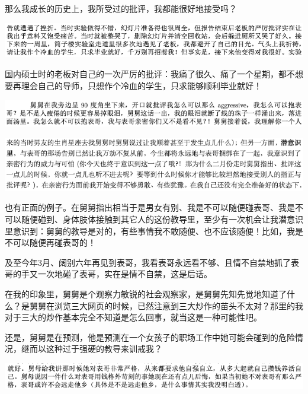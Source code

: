 \documentclass[9pt, b5paper]{article}
\begin{document}
那么我成长的历史上，我所受过的批评，我都能很好地接受吗？

\begin{center}
\includegraphics[width=.9\linewidth]{./pic/backups_plans_20210412_110225.png}
\end{center}

国内硕士时的老板对自己的一次严厉的批评：我痛了很久、痛了一个星期，都不想要再理会自己的导师，只想作个冷血的学生，只求能够顺利毕业就好！

\begin{center}
\includegraphics[width=.9\linewidth]{./pic/backups_plans_20210412_110604.png}
\end{center}

\begin{center}
\includegraphics[width=.9\linewidth]{./pic/backups_plans_20210412_110513.png}
\end{center}

也有正面的例子。在舅舅指出相当于是男女有别、我是不可以随便碰表哥、我是不可以随便碰到、身体肢体接触到其它人的这份教导里，至少有一次机会让我潜意识里意识到：舅舅的教导是对的，有些事情我不敢随便、也不应该随便！比如，我是不可以随便再碰表哥的！

及至今年3月、阔别六年再见到表哥，我看表哥永远看不够、且情不自禁地抓了表哥的手又一次地碰了表哥，实在是情不自禁，这是后话。 

在我的印象里，舅舅是个观察力敏锐的社会观察家，是舅舅先知先觉地知道了什么？是舅舅在浏览三大网页的时候，已然注意到三大炒作的苗头不太对？那里的我对于三大的炒作基本完全不知道是怎么回事，就当这是一种可能性吧。

还是，舅舅是在预测，他是预测在一个女孩子的职场工作中她可能会碰到的危险情况，继而以这种过于强硬的教导来训戒我？

\begin{center}
\includegraphics[width=.9\linewidth]{./pic/backups_plans_20210412_112222.png}
\end{center}
\end{document}
